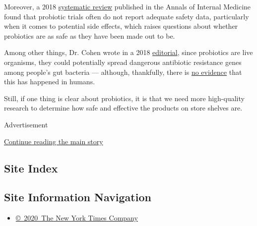 Moreover, a 2018
\href{https://www.ncbi.nlm.nih.gov/pubmed/30014150}{systematic review}
published in the Annals of Internal Medicine found that probiotic trials
often do not report adequate safety data, particularly when it comes to
potential side effects, which raises questions about whether probiotics
are as safe as they have been made out to be.

Among other things, Dr. Cohen wrote in a 2018
\href{https://jamanetwork.com/journals/jamainternalmedicine/article-abstract/2702973}{editorial},
since probiotics are live organisms, they could potentially spread
dangerous antibiotic resistance genes among people's gut bacteria ---
although, thankfully, there is
\href{https://www.ncbi.nlm.nih.gov/pubmed/19997864}{no evidence} that
this has happened in humans.

Still, if one thing is clear about probiotics, it is that we need more
high-quality research to determine how safe and effective the products
on store shelves are.

Advertisement

\protect\hyperlink{after-bottom}{Continue reading the main story}

\hypertarget{site-index}{%
\subsection{Site Index}\label{site-index}}

\hypertarget{site-information-navigation}{%
\subsection{Site Information
Navigation}\label{site-information-navigation}}

\begin{itemize}
\tightlist
\item
  \href{https://help.nytimes.com/hc/en-us/articles/115014792127-Copyright-notice}{©~2020~The
  New York Times Company}
\end{itemize}

